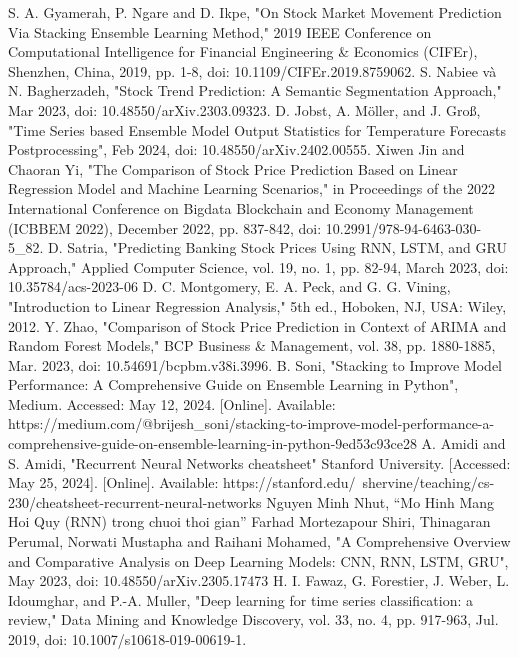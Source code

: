 \documentclass{ieeeojies}
\begin{document}
\begin{thebibliography}{00}
 S. A. Gyamerah, P. Ngare and D. Ikpe, "On Stock Market Movement Prediction Via Stacking Ensemble Learning Method," 2019 IEEE Conference on Computational Intelligence for Financial Engineering \& Economics (CIFEr), Shenzhen, China, 2019, pp. 1-8, doi: 10.1109/CIFEr.2019.8759062.
 S. Nabiee và N. Bagherzadeh, "Stock Trend Prediction: A Semantic Segmentation Approach,"  Mar 2023, doi: 10.48550/arXiv.2303.09323.
 D. Jobst, A. Möller, and J. Groß, "Time Series based Ensemble Model Output Statistics for Temperature Forecasts Postprocessing", Feb 2024, doi: 10.48550/arXiv.2402.00555.
 Xiwen Jin and Chaoran Yi, "The Comparison of Stock Price Prediction Based on Linear Regression Model and Machine Learning Scenarios," in Proceedings of the 2022 International Conference on Bigdata Blockchain and Economy Management (ICBBEM 2022), December 2022, pp. 837-842, doi: 10.2991/978-94-6463-030-5\_82.
 D. Satria, "Predicting Banking Stock Prices Using RNN, LSTM, and GRU Approach," Applied Computer Science, vol. 19, no. 1, pp. 82-94, March 2023, doi: 10.35784/acs-2023-06
 D. C. Montgomery, E. A. Peck, and G. G. Vining, "Introduction to Linear Regression Analysis," 5th ed., Hoboken, NJ, USA: Wiley, 2012.
 Y. Zhao, "Comparison of Stock Price Prediction in Context of ARIMA and Random Forest Models," BCP Business \& Management, vol. 38, pp. 1880-1885, Mar. 2023, doi: 10.54691/bcpbm.v38i.3996.
 B. Soni, "Stacking to Improve Model Performance: A Comprehensive Guide on Ensemble Learning in Python", Medium. Accessed: May 12, 2024. [Online]. Available: https://medium.com/@brijesh\_soni/stacking-to-improve-model-performance-a-comprehensive-guide-on-ensemble-learning-in-python-9ed53c93ce28
 A. Amidi and S. Amidi, "Recurrent Neural Networks cheatsheet" Stanford University. [Accessed: May 25, 2024]. [Online]. Available: https://stanford.edu/~shervine/teaching/cs-230/cheatsheet-recurrent-neural-networks
 Nguyen Minh Nhut, “Mo Hinh Mang Hoi Quy (RNN) trong chuoi thoi gian”
 Farhad Mortezapour Shiri, Thinagaran Perumal, Norwati Mustapha and Raihani Mohamed, "A Comprehensive Overview and Comparative Analysis on Deep Learning Models: CNN, RNN, LSTM, GRU", May 2023, doi: 10.48550/arXiv.2305.17473
 H. I. Fawaz, G. Forestier, J. Weber, L. Idoumghar, and P.-A. Muller, "Deep learning for time series classification: a review," Data Mining and Knowledge Discovery, vol. 33, no. 4, pp. 917-963, Jul. 2019, doi: 10.1007/s10618-019-00619-1.
\end{thebibliography}
\EOD
\end{document}
